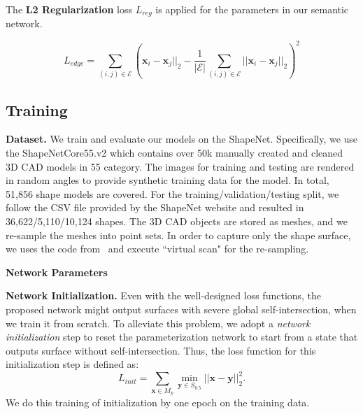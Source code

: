 The \textbf{L2 Regularization} loss $L_{reg}$ is applied for the parameters in our semantic network. 


\begin{equation}
\label{equ:edgereg}
L_{edge} = \sum_{(i,j)\in\mathcal{E}}(\mathbf{x}_i-\mathbf{x}_j||_2 - \frac{1}{|\mathcal{E}|}\sum_{(i,j)\in\mathcal{E} }||\mathbf{x}_i-\mathbf{x}_j||_2)^2
\end{equation}



\subsection{Training} 

\noindent \textbf{Dataset.}
We train and evaluate our models on the ShapeNet\cite{shapenetdata}. Specifically, we use the ShapeNetCore55.v2 which contains over 50k manually created and cleaned 3D CAD models in 55 category.
The images for training and testing are rendered in random angles to provide synthetic training data for the model. 
In total, 51,856 shape models are covered. 
For the training/validation/testing split, we follow the CSV file provided by the ShapeNet website and resulted in 36,622/5,110/10,124 shapes. 
The 3D CAD objects are stored as meshes, and we re-sample the meshes into point sets. 
In order to capture only the shape surface, we uses the code from~\cite{ocnn} and execute ``virtual scan" for the re-sampling.

\noindent \textbf{Network Parameters}


\noindent \textbf{Network Initialization.}
Even with the well-designed loss functions, the proposed network might output surfaces with severe global self-intersection, when we train it from scratch.
%
To alleviate this problem, we adopt a \emph{network initialization} step to reset the parameterization network to start from a state that outputs surface without self-intersection. 
Thus, the loss function for this initialization step is defined as:
\begin{equation}
\label{equ:init}
L_{init} = \sum_{\mathbf{x}\in M_p}\min_{\mathbf{y}\in S_{0.5}}||\mathbf{x} - \mathbf{y}||_2^2.
\end{equation} 
We do this training of initialization by one epoch on the training data. 


